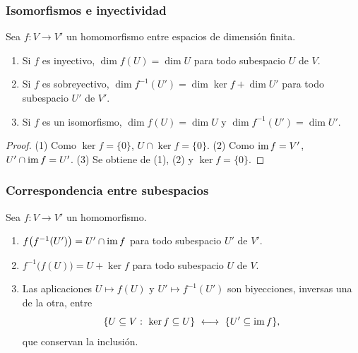\begin{frame}
    \frametitle{Isomorfismos e inyectividad}

    \begin{corollary}
        Sea $f\colon V\to V'$ un homomorfismo entre espacios de dimensión
        finita.
        \begin{enumerate}[(1)]
            \item Si $f$ es inyectivo, $\dim f(U)=\dim U$ para todo
            subespacio $U$ de $V$.
            \item Si $f$ es sobreyectivo, $\dim f^{-1}(U')=\dim\ker f+\dim U'$
            para todo subespacio $U'$ de $V'$.
            \item Si $f$ es un isomorfismo, $\dim f(U)=\dim U$ y
            $\dim f^{-1}(U')=\dim U'$.
        \end{enumerate}
    \end{corollary}

    \begin{proof}
        (1) Como $\ker f=\{0\}$, $U\cap\ker f=\{0\}$. (2) Como
        $\operatorname{im} f=V'$, $U'\cap\operatorname{im} f=U'$. (3) Se obtiene de (1), (2) y
        $\ker f=\{0\}$.
    \end{proof}
\end{frame}


\begin{frame}
    \frametitle{Correspondencia entre subespacios}

    \begin{theorem}
        Sea $f\colon V\to V'$ un homomorfismo.
        \begin{enumerate}[(1)]
            \item $f\bigl(f^{-1}(U')\bigr)=U'\cap\operatorname{im} f$ para todo
            subespacio $U'$ de $V'$.
            \item $f^{-1}\bigl(f(U)\bigr)=U+\ker f$ para todo subespacio
            $U$ de $V$.
            \item Las aplicaciones $U\mapsto f(U)$ y
            $U'\mapsto f^{-1}(U')$ son biyecciones, inversas una de la
            otra, entre
            \[
                \{U\subseteq V:\ \ker f\subseteq U\}
                \ \longleftrightarrow\
                \{U'\subseteq\operatorname{im} f\},
            \]
            que conservan la inclusión.
        \end{enumerate}
    \end{theorem}
\end{frame}


